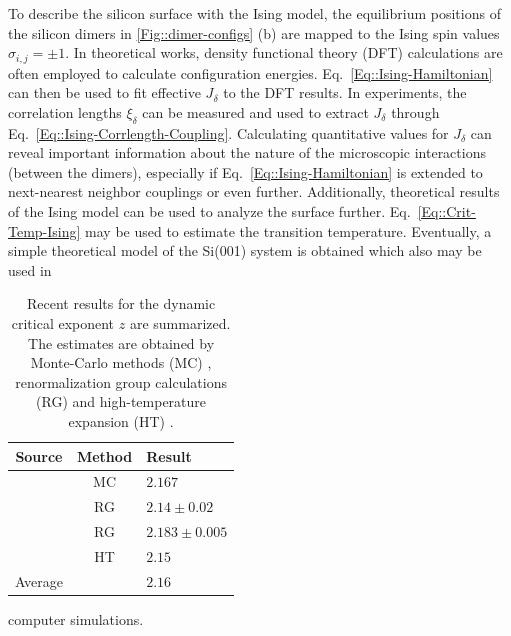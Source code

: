 	To describe the silicon surface with the Ising model, the equilibrium positions of the silicon dimers in \autoref{Fig::dimer-configs} (b) are mapped to the Ising spin values $\sigma_{i ,j} =	\pm 1$. In theoretical works, density functional theory (DFT) calculations are often employed to calculate configuration energies.   Eq.~\eqref{Eq::Ising-Hamiltonian} can then be used to fit effective  $J_\delta$ to the DFT results. In experiments, the correlation lengths $\xi_\delta$ can be measured and used to extract $J_\delta$ through Eq.~\eqref{Eq::Ising-Corrlength-Coupling}. Calculating quantitative values for $J_\delta$ can reveal important information about the nature of the microscopic interactions (between the dimers), especially if Eq.~\eqref{Eq::Ising-Hamiltonian} is extended to next-nearest neighbor couplings or even further. Additionally, theoretical
	results of the Ising model can be used to analyze the surface further. Eq.~\eqref{Eq::Crit-Temp-Ising} may be used to estimate the transition temperature. Eventually, a simple theoretical model of the Si(001) system is obtained which also may be used in
	\begin{table}
		\caption{Recent results for the dynamic critical exponent $z$ are summarized. The estimates are obtained by Monte-Carlo methods (MC) \cite{nightingale2000monte}, renormalization group calculations (RG) \cite{adzhemyan2022dynamic, duclut2017frequency} and high-temperature expansion (HT) \cite{dammann1993dynamical}.}
		\renewcommand{\arraystretch}{1.3}
		\begin{tabular}{c c l}
			Source & Method  & Result \\
			\midrule
			\cite{nightingale2000monte} & MC &  $2.167$ \\
			\cite{adzhemyan2022dynamic} & RG &  $2.14 \pm 0.02$ \\
			\cite{duclut2017frequency} & RG &  $2.183 \pm 0.005$ \\
			\cite{dammann1993dynamical} & HT &  $2.15$ \\
			\bottomrule
			Average &  &  $2.16$ \\
		\end{tabular}
		\label{Figure::Ising-z-values}
	\end{table}
	computer simulations. \\
	
